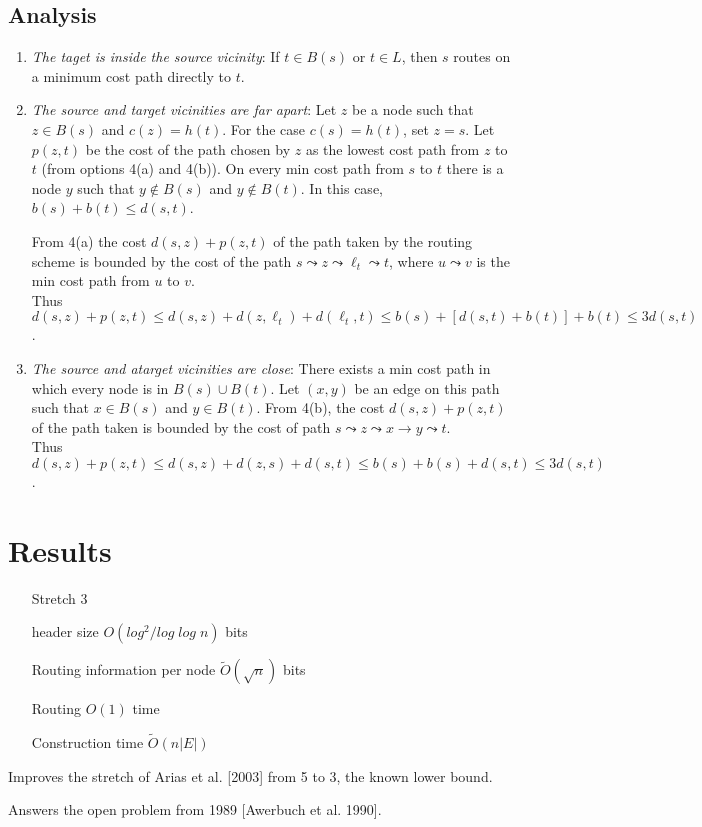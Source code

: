 \subsection{Analysis}
\begin{enumerate}
    \item \textit{The taget is inside the source vicinity}: If $t\in B(s)$ or $t\in L$, then $s$ routes on a minimum cost path directly to $t$.
    \item \textit{The source and target vicinities are far apart}: Let $z$ be a node such that $z\in B(s)$ and $c(z)=h(t)$. For the case $c(s)=h(t)$, set $z=s$. Let $p(z,t)$ be the cost of the path chosen by $z$ as the lowest cost   path from $z$ to $t$ (from options 4(a) and 4(b)).
    On every min cost path from $s$ to $t$ there is a node $y$ such that $y\not\in B(s)$ and $y\not\in B(t)$. In this case, $b(s)+b(t)\leq d(s,t)$.

    From 4(a) the cost $d(s,z)+p(z, t)$ of the path taken by the routing scheme is bounded by the cost of the path $s\leadsto z\leadsto \ell_t\leadsto t$, where $u\leadsto v$ is the min cost path from $u$ to $v$.\\
    Thus $d(s,z)+p(z,t) \leq d(s,z)+d(z,\ell_t)+d(\ell_t,t) \leq b(s) + [d(s,t) + b(t)] + b(t) \leq 3d(s,t)$.
    \item \textit{The source and atarget vicinities are close}: There exists a min cost path in which every node is in $B(s)\cup B(t)$. Let $(x,y)$ be an edge on this path such that $x\in B(s)$ and $y\in B(t)$. From 4(b), the cost $d(s,z)+p(z,t)$ of the path taken is bounded by the cost of path $s\leadsto z\leadsto x\rightarrow y \leadsto t$.\\
    Thus $d(s,z)+p(z,t) \leq d(s,z) + d(z,s) + d(s,t) \leq b(s)+b(s)+d(s,t)\leq 3d(s,t)$.
\end{enumerate}


\section{Results}
\begin{itemize}
    \item[Stretch] 3
    \item[header size] $O(log^2/log\;log\;n)$ bits
    \item[Routing information per node] $\tilde{O}(\sqrt{n})$ bits
    \item[Routing] $O(1)$ time
    \item[Construction time] $\tilde{O}(n|E|)$
\end{itemize}
Improves the stretch of Arias et al. [2003] from 5 to 3, the known lower bound.

Answers the open problem from 1989 [Awerbuch et al. 1990].
